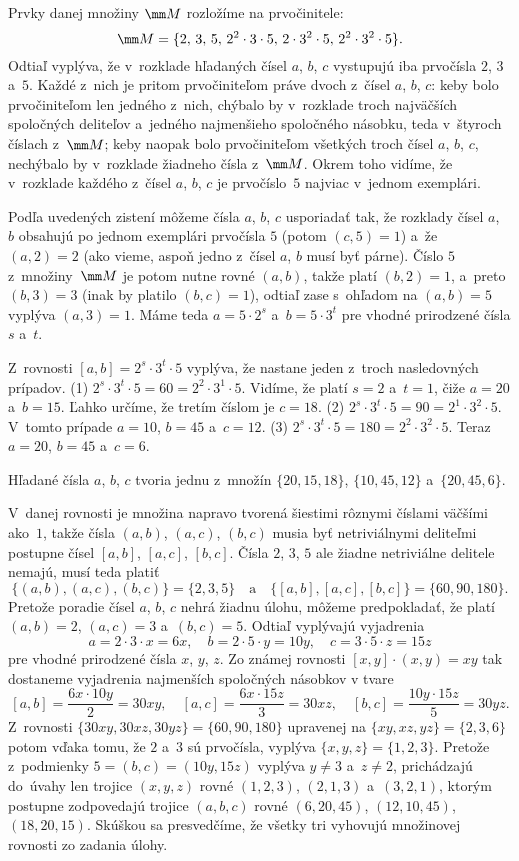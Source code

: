 {%
Prvky danej množiny $\mm M$ rozložíme na prvočinitele:
$$
{\mm M}=\{2,\,3,\,5,\,2^2\cdot3\cdot5,\,2\cdot3^2\cdot5,\,2^2\cdot3^2\cdot5\}.
$$
Odtiaľ vyplýva, že v~rozklade hľadaných čísel $a$, $b$, $c$ vystupujú
iba prvočísla $2$, $3$ a~$5$. Každé z~nich je pritom
prvočiniteľom práve dvoch z~čísel $a$, $b$, $c$: keby bolo
prvočiniteľom len jedného z~nich, chýbalo by v~rozklade troch
najväčších spoločných deliteľov a~jedného najmenšieho spoločného
násobku, teda v~štyroch číslach z~$\mm M$; keby naopak bolo
prvočiniteľom všetkých troch čísel $a$, $b$, $c$, nechýbalo by v~rozklade
žiadneho čísla z~$\mm M$. Okrem toho vidíme, že v~rozklade každého
z~čísel $a$, $b$, $c$ je prvočíslo~$5$ najviac v~jednom exemplári.

Podľa uvedených zistení môžeme čísla $a$, $b$, $c$ usporiadať tak, že
rozklady čísel $a$,~$b$ obsahujú po jednom exemplári prvočísla $5$
(potom $(c,5)=1$) a~že $(a,2)=2$ (ako vieme,
aspoň jedno z~čísel $a$, $b$ musí byť párne).
Číslo $5$ z~množiny~$\mm M$ je potom nutne rovné $(a,b)$, takže
platí $(b,2)=1$, a~preto $(b,3)=3$ (inak by platilo $(b,c)=1$),
odtiaľ zase s~ohľadom na $(a,b)=5$ vyplýva $(a,3)=1$.
Máme teda $a=5\cdot2^s$ a~$b=5\cdot3^t$ pre vhodné prirodzené
čísla $s$ a~$t$.

Z~rovnosti $[a,b]=2^{s}\cdot3^{t}\cdot5$ vyplýva, že nastane
jeden z~troch nasledovných prípadov.
\ite(1) $2^{s}\cdot3^{t}\cdot5=60=2^{2}\cdot3^{1}\cdot5$. Vidíme,
že platí $s=2$ a~$t=1$, čiže $a=20$ a~$b=15$. Ľahko
určíme, že tretím číslom je $c=18$.
\ite(2) $2^{s}\cdot3^{t}\cdot5=90=2^{1}\cdot3^{2}\cdot5$.
V~tomto prípade $a=10$, $b=45$ a~$c=12$.
\ite(3) $2^{s}\cdot3^{t}\cdot5=180=2^{2}\cdot3^{2}\cdot5$.
Teraz $a=20$, $b=45$ a~$c=6$.

\odpoved
Hľadané čísla $a$, $b$, $c$ tvoria jednu z~množín
$\{20,15,18\}$, $\{10,45,12\}$ a~$\{20,45,6\}$.

\ineriesenie
V~danej rovnosti je množina napravo tvorená šiestimi rôznymi číslami
väčšími  ako~$1$, takže čísla $(a,b)$, $(a,c)$, $(b,c)$ musia byť
netriviálnymi deliteľmi postupne čísel $[a,b]$, $[a,c]$, $[b,c]$.
Čísla $2$, $3$, $5$ ale žiadne netriviálne delitele nemajú,
musí teda platiť
$$
\bigl\{(a,b),(a,c),(b,c)\bigr\}=\{2,3,5\}
\quad\text{a}\quad
\bigl\{[a,b],[a,c],[b,c]\bigr\}=\{60,90,180\}.
$$
Pretože poradie čísel $a$, $b$, $c$ nehrá žiadnu úlohu, môžeme predpokladať,
že platí $(a,b)=2$, $(a,c)=3$ a~$(b,c)=5$. Odtiaľ vyplývajú
vyjadrenia
$$
a=2\cdot3\cdot x=6x,\quad b=2\cdot5\cdot y=10y,
\quad c=3\cdot5\cdot z=15z
$$
pre vhodné prirodzené čísla $x$, $y$, $z$. Zo známej rovnosti
$[x,y]\cdot(x,y)=xy$ tak dostaneme vyjadrenia najmenších spoločných
násobkov v tvare
$$
[a,b]=\frac{6x\cdot10y}{2}=30xy,\quad
[a,c]=\frac{6x\cdot15z}{3}=30xz,\quad
[b,c]=\frac{10y\cdot15z}{5}=30yz.
$$
Z~rovnosti $\{30xy,30xz,30yz\}=\{60,90,180\}$ upravenej na
$\{xy,xz,yz\}=\{2,3,6\}$ potom vďaka tomu, že $2$ a~$3$ sú prvočísla,
vyplýva $\{x,y,z\}=\{1,2,3\}$. Pretože z~podmienky
$5=(b,c)=(10y,15z)$ vyplýva $y\ne3$ a~$z\ne2$, prichádzajú do~úvahy
len trojice $(x,y,z)$ rovné $(1,2,3)$, $(2,1,3)$ a~$(3,2,1)$,
ktorým postupne zodpovedajú trojice $(a,b,c)$ rovné $(6,20,45)$,
$(12,10,45)$, $(18,20,15)$. Skúškou sa presvedčíme, že všetky
tri vyhovujú množinovej rovnosti zo zadania úlohy.

}
